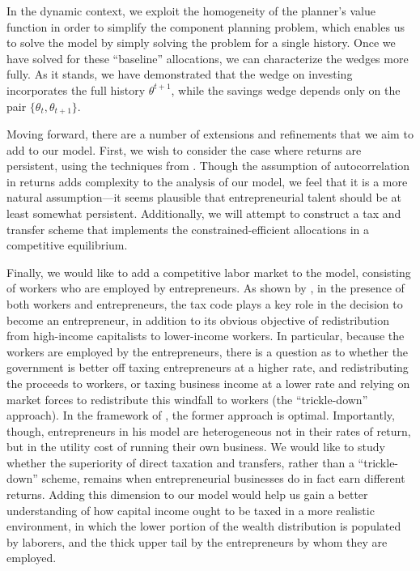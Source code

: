 \documentclass[11pt]{article}
\begin{document}
In the dynamic context, we exploit the homogeneity of the planner's value function in order to simplify the component planning problem, which enables us to solve the model by simply solving the problem for a single history. Once we have solved for these ``baseline'' allocations, we can characterize the wedges more fully. As it stands, we have demonstrated that the wedge on investing incorporates the full history \( \theta^{t+1} \), while the savings wedge depends only on the pair \( \{\theta_t, \theta_{t+1}\} \). 

Moving forward, there are a number of extensions and refinements that we aim to add to our model. First, we wish to consider the case where returns are persistent, using the techniques from \cite{farhi2013insurance}. Though the assumption of autocorrelation in returns adds complexity to the analysis of our model, we feel that it is a more natural assumption---it seems plausible that entrepreneurial talent should be at least somewhat persistent. Additionally, we will attempt to construct a tax and transfer scheme that implements the constrained-efficient allocations in a competitive equilibrium. 

Finally, we would like to add a competitive labor market to the model, consisting of workers who are employed by entrepreneurs. As shown by \cite{scheuer2014entrepreneurial}, in the presence of both workers and entrepreneurs, the tax code plays a key role in the decision to become an entrepreneur, in addition to its obvious objective of redistribution from high-income capitalists to lower-income workers. In particular, because the workers are employed by the entrepreneurs, there is a question as to whether the government is better off taxing entrepreneurs at a higher rate, and redistributing the proceeds to workers, or taxing business income at a lower rate and relying on market forces to redistribute this windfall to workers (the ``trickle-down'' approach). In the framework of \cite{scheuer2014entrepreneurial}, the former approach is optimal. Importantly, though, entrepreneurs in his model are heterogeneous not in their rates of return, but in the utility cost of running their own business. We would like to study whether the superiority of direct taxation and transfers, rather than a ``trickle-down'' scheme, remains when entrepreneurial businesses do in fact earn different returns. Adding this dimension to our model would help us gain a better understanding of how capital income ought to be taxed in a more realistic environment, in which the lower portion of the wealth distribution is populated by laborers, and the thick upper tail by the entrepreneurs by whom they are employed.  
\end{document}
